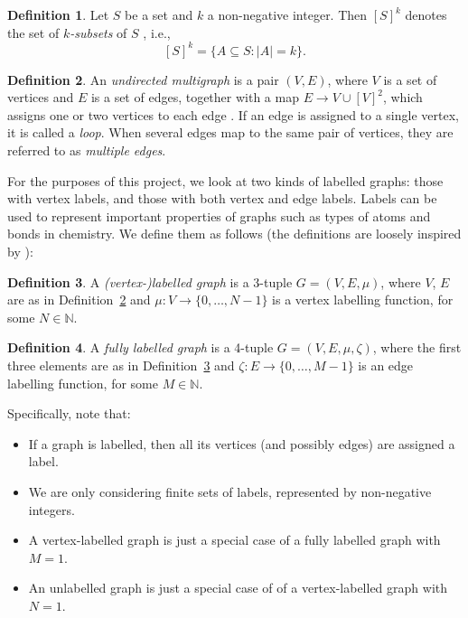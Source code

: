 \documentclass{l4proj}
\theoremstyle{definition}
\newtheorem{definition}{Definition}[chapter]
\theoremstyle{remark}
\begin{document}
\begin{definition}
  Let $S$ be a set and $k$ a non-negative integer. Then $[S]^k$ denotes
  the set of \emph{$k$-subsets} of $S$ \cite{subset}, i.e.,
  \[ [S]^k = \{ A \subseteq S : |A| = k \}. \]
\end{definition}

\begin{definition} \label{def:graph}
  An \emph{undirected multigraph} is a pair $(V, E)$, where $V$ is a set of
  vertices and $E$ is a set of edges, together with a map $E \to V \cup [V]^2$,
  which assigns one or two vertices to each edge
  \cite{DBLP:books/daglib/0030488}. If an edge is assigned to a single vertex,
  it is called a \emph{loop}. When several edges map to the same pair of
  vertices, they are referred to as \emph{multiple edges}. 
\end{definition}
For the purposes of this project, we look at two kinds of labelled graphs: those
with vertex labels, and those with both vertex and edge labels. Labels can be
used to represent important properties of graphs such as types of atoms and
bonds in chemistry. We define them as follows (the definitions are loosely
inspired by \cite{abu-aisheh_2016}):

\begin{definition} \label{def:vertex_label}
  A \emph{(vertex-)labelled graph} is a 3-tuple $G = (V, E, \mu)$, where $V$,
  $E$ are as in Definition~\ref{def:graph} and $\mu \colon V \to \{ 0, \dots, N
  - 1 \}$ is a vertex labelling function, for some $N \in \mathbb{N}$.
\end{definition}

\begin{definition} \label{def:edge_label}
  A \emph{fully labelled graph} is a 4-tuple $G = (V, E, \mu, \zeta)$, where the
  first three elements are as in Definition~\ref{def:vertex_label} and $\zeta
  \colon E \to \{ 0, \dots, M - 1 \}$ is an edge labelling function, for some $M
  \in \mathbb{N}$.
\end{definition}
Specifically, note that:

\begin{itemize}
\item If a graph is labelled, then all its vertices (and possibly edges) are
  assigned a label.
\item We are only considering finite sets of labels, represented by non-negative
  integers.
\item A vertex-labelled graph is just a special case of a fully labelled graph
  with $M = 1$.
\item An unlabelled graph is just a special case of of a vertex-labelled graph
  with $N = 1$.
\end{itemize}
\end{document}
